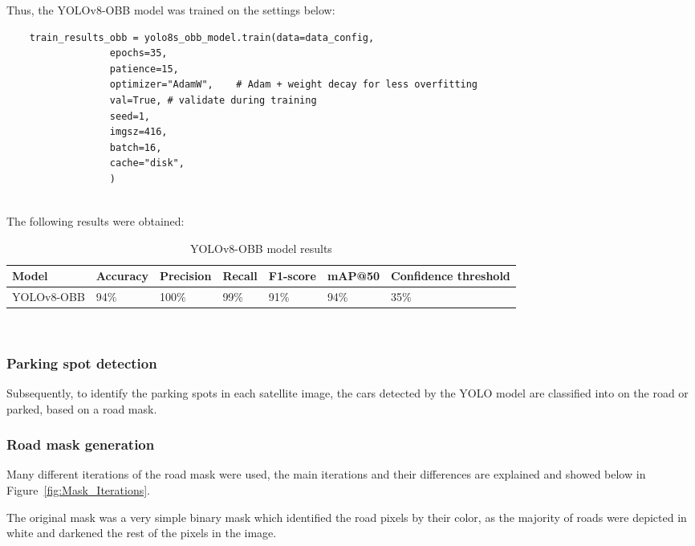 Thus, the YOLOv8-OBB model was trained on the settings below:
\begin{listing}[h!]
  \centering
  \begin{verbatim}
    train_results_obb = yolo8s_obb_model.train(data=data_config,
                  epochs=35,
                  patience=15,
                  optimizer="AdamW",    # Adam + weight decay for less overfitting
                  val=True, # validate during training
                  seed=1,
                  imgsz=416,
                  batch=16,
                  cache="disk",
                  )
  \end{verbatim}
\end{listing}\\
The following results were obtained:
\begin{table}[h!]
  \centering
  \begin{tabular}{|p{}|p{}|p{}|p{}|p{}|p{}|p{}|}
    \hline
    \textbf{Model} & \textbf{Accuracy} & \textbf{Precision} & \textbf{Recall} & \textbf{F1-score} & \textbf{mAP@50} & \textbf{Confidence threshold} \\
    \hline
    YOLOv8-OBB     & 94\%              & 100\%              & 99\%            & 91\%              & 94\%            & 35\%                          \\
    \hline
  \end{tabular}
  \caption{YOLOv8-OBB model results}
\end{table}\\

\newpage
\subsubsection{Parking spot detection}
Subsequently, to identify the parking spots in each satellite image, the cars detected by the YOLO model are classified into on the road or parked, based on a road mask.

\subsubsection{Road mask generation} \label{sec:road_mask_generation}
Many different iterations of the road mask were used, the main iterations and their differences are explained and showed below in Figure~\ref{fig:Mask_Iterations}.

The original mask was a very simple binary mask which identified the road pixels by their color, as the majority of roads were depicted in white and darkened the rest of the pixels in the image.

